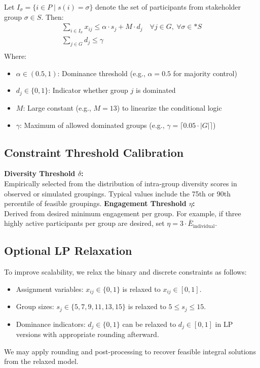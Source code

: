 Let \(I_\sigma = \{i \in P \mid s(i) = \sigma\}\) denote the set of participants from stakeholder group \(\sigma \in S\).
Then:
\begin{gather*}
    \sum_{i \in I_\sigma} x_{ij} \leq \alpha \cdot s_j + M \cdot d_j \quad \forall j \in G,\ \forall \sigma \in* S\\
    \sum_{j \in G} d_j \leq \gamma\\
\end{gather*}
Where:
\begin{itemize}
    \item \(\alpha \in (0.5, 1)\): Dominance threshold (e.g., \(\alpha = 0.5\) for majority control)
    \item \(d_j \in \{0,1\}\): Indicator whether group \(j\) is dominated
    \item \(M\): Large constant (e.g., \(M = 13\)) to linearize the conditional logic
    \item \(\gamma\): Maximum of allowed dominated groups (e.g., \(\gamma = \lceil 0.05 \cdot |G| \rceil\))
\end{itemize}
\noindent
\subsection*{Constraint Threshold Calibration}
\textbf{Diversity Threshold \(\delta\):}\\[3pt]
Empirically selected from the distribution of intra-group diversity scores in observed or simulated groupings.
Typical values include the 75th or 90th percentile of feasible groupings.
\noindent
\textbf{Engagement Threshold \(\eta\):}\\[3pt]
Derived from desired minimum engagement per group.
For example, if three highly active participants per group are desired,
set \(\eta = 3 \cdot \bar{E}_{\text{individual}}\).

\subsection*{Optional LP Relaxation}

To improve scalability, we relax the binary and discrete constraints as follows:
\begin{itemize}
    \item Assignment variables: \quad $x_{ij} \in \{0,1\}$ is relaxed to $x_{ij} \in [0,1]$.
    \item Group sizes: \quad $s_j \in \{5,7,9,11,13,15\}$ is relaxed to $5 \leq s_j \leq 15$.
    \item Dominance indicators: \quad $d_j \in \{0,1\}$ can be relaxed to $d_j \in [0,1]$ in LP versions with appropriate rounding afterward.
\end{itemize}
We may apply rounding and post-processing to recover feasible integral solutions from the relaxed model.
